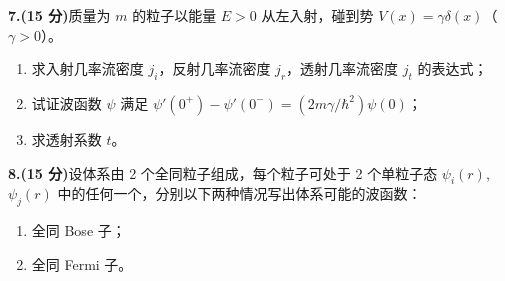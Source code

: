 \textbf{7.(15 分)}质量为 $m$ 的粒子以能量 $E > 0$ 从左入射，碰到势 $V(x) = \gamma \delta(x)$（$\gamma > 0$）。

\begin{enumerate}
    \item 求入射几率流密度 $j_i$，反射几率流密度 $j_r$，透射几率流密度 $j_t$ 的表达式；
    \item 试证波函数 $\psi$ 满足 $\psi'(0^+) - \psi'(0^-) = (2m\gamma/\hbar^2)\psi(0)$；
    \item 求透射系数 $t$。
\end{enumerate}

\textbf{8.(15 分)}设体系由 2 个全同粒子组成，每个粒子可处于 2 个单粒子态 $\psi_i(r)$, $\psi_j(r)$ 中的任何一个，分别以下两种情况写出体系可能的波函数：

\begin{enumerate}
    \item 全同 Bose 子；
    \item 全同 Fermi 子。
\end{enumerate}